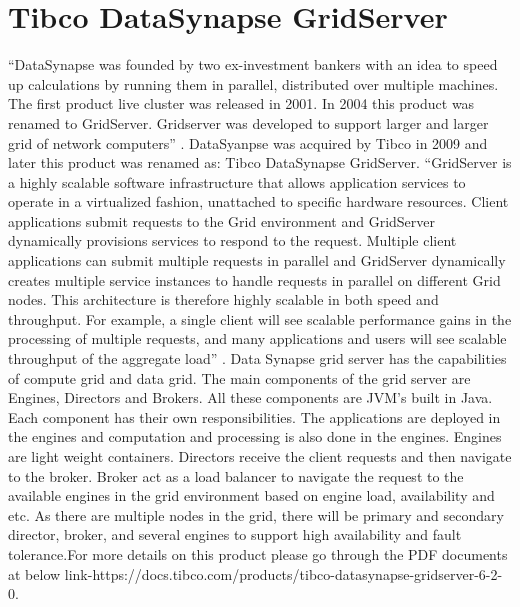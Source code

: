 \section{Tibco DataSynapse GridServer}

“DataSynapse was founded by two ex-investment bankers with an idea to speed up calculations by running them in parallel, 
distributed over multiple machines. The first product live cluster was released in 2001. 
In 2004 this product was renamed to GridServer. Gridserver was developed to support larger 
and larger grid of network computers” \cite{hid-sp18-514-datasynapsewiki}.
DataSyanpse was acquired by Tibco in 2009 and later this product was renamed as: 
Tibco DataSynapse GridServer\cite{hid-sp18-514-tibcodatasynapsewiki}.
“GridServer is a highly scalable software infrastructure that allows application services to operate in a virtualized fashion, 
unattached to specific hardware resources. Client applications submit requests to the Grid environment 
and GridServer dynamically provisions services to respond to the request. 
Multiple client applications can submit multiple requests in parallel and GridServer dynamically 
creates multiple service instances to handle requests in parallel on different Grid nodes. 
This architecture is therefore highly scalable in both speed and throughput. For example, 
a single client will see scalable performance gains in the processing of multiple requests, 
and many applications and users will see scalable throughput of the aggregate load” \cite{hid-sp18-514-tibcods}.
Data Synapse grid server has the capabilities of compute grid and data grid. The main components of the grid server are Engines, 
Directors and Brokers. All these components are JVM’s built in Java.  
Each component has their own responsibilities. The applications are deployed in the engines and computation and processing 
is also done in the engines. Engines are light weight containers. Directors receive the client requests 
and then navigate to the broker. Broker act as a load balancer to navigate the request to the available engines 
in the grid environment based on engine load, availability and etc. As there are multiple nodes in the grid, 
there will be primary and secondary director, broker, and several engines to support high availability 
and fault tolerance\cite{hid-sp18-514-tibcods}.For more details on this product 
please go through the PDF documents at below link-https://docs.tibco.com/products/tibco-datasynapse-gridserver-6-2-0.
